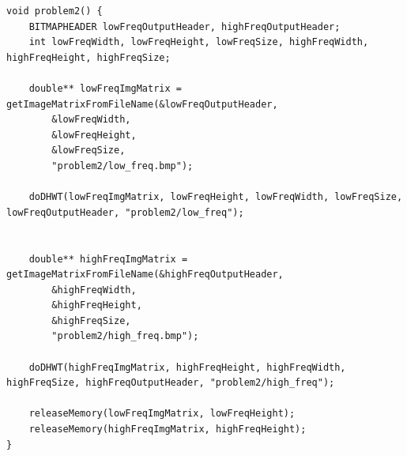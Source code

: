 \begin{verbatim}
void problem2() {
    BITMAPHEADER lowFreqOutputHeader, highFreqOutputHeader;
    int lowFreqWidth, lowFreqHeight, lowFreqSize, highFreqWidth, highFreqHeight, highFreqSize;

    double** lowFreqImgMatrix = getImageMatrixFromFileName(&lowFreqOutputHeader,
        &lowFreqWidth,
        &lowFreqHeight,
        &lowFreqSize,
        "problem2/low_freq.bmp");

    doDHWT(lowFreqImgMatrix, lowFreqHeight, lowFreqWidth, lowFreqSize, lowFreqOutputHeader, "problem2/low_freq");


    double** highFreqImgMatrix = getImageMatrixFromFileName(&highFreqOutputHeader,
        &highFreqWidth,
        &highFreqHeight,
        &highFreqSize,
        "problem2/high_freq.bmp");

    doDHWT(highFreqImgMatrix, highFreqHeight, highFreqWidth, highFreqSize, highFreqOutputHeader, "problem2/high_freq");

    releaseMemory(lowFreqImgMatrix, lowFreqHeight);
    releaseMemory(highFreqImgMatrix, highFreqHeight);
}
\end{verbatim}
\pagebreak

